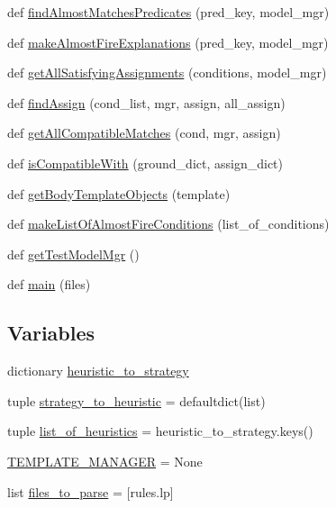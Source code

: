 \begin{DoxyCompactItemize}
\item 
def \hyperlink{namespaceexplanation__extractor_a97bc4aa83dd1f33e2055e0cd04280983}{find\+Almost\+Matches\+Predicates} (pred\+\_\+key, model\+\_\+mgr)
\item 
def \hyperlink{namespaceexplanation__extractor_ad9ad528058d7d4a987217e34962fafa1}{make\+Almost\+Fire\+Explanations} (pred\+\_\+key, model\+\_\+mgr)
\item 
def \hyperlink{namespaceexplanation__extractor_a245c76a80c6861aa9913a4c0ae657532}{get\+All\+Satisfying\+Assignments} (conditions, model\+\_\+mgr)
\item 
def \hyperlink{namespaceexplanation__extractor_aa2ee543a844a51fd175237425613e637}{find\+Assign} (cond\+\_\+list, mgr, assign, all\+\_\+assign)
\item 
def \hyperlink{namespaceexplanation__extractor_a6f48fd0483449ab57c4fc59bf46d9030}{get\+All\+Compatible\+Matches} (cond, mgr, assign)
\item 
def \hyperlink{namespaceexplanation__extractor_ac4ebd7452ba8d0cd181de6ff9e826a97}{is\+Compatible\+With} (ground\+\_\+dict, assign\+\_\+dict)
\item 
def \hyperlink{namespaceexplanation__extractor_a9ff3544e6f17deeb9ca26720176c3425}{get\+Body\+Template\+Objects} (template)
\item 
def \hyperlink{namespaceexplanation__extractor_aceb0f7d5fe4722c93251a451c0887cf9}{make\+List\+Of\+Almost\+Fire\+Conditions} (list\+\_\+of\+\_\+conditions)
\item 
def \hyperlink{namespaceexplanation__extractor_a83d1ad83ea4f6f229f663c8f2a6fec4e}{get\+Test\+Model\+Mgr} ()
\item 
def \hyperlink{namespaceexplanation__extractor_ab07ea7707a24b1b7c5a0abfeab45c62d}{main} (files)
\end{DoxyCompactItemize}
\subsection*{Variables}
\begin{DoxyCompactItemize}
\item 
dictionary \hyperlink{namespaceexplanation__extractor_a4e9dc7c262525efa41529de247ccb96a}{heuristic\+\_\+to\+\_\+strategy}
\item 
tuple \hyperlink{namespaceexplanation__extractor_ac32b3e381284882ab71367fde9f5c646}{strategy\+\_\+to\+\_\+heuristic} = defaultdict(list)
\item 
tuple \hyperlink{namespaceexplanation__extractor_a4f4d79f4f4c8925bd6353200232eb735}{list\+\_\+of\+\_\+heuristics} = heuristic\+\_\+to\+\_\+strategy.\+keys()
\item 
\hyperlink{namespaceexplanation__extractor_add16cd790071f284854455eddfa329a1}{T\+E\+M\+P\+L\+A\+T\+E\+\_\+\+M\+A\+N\+A\+G\+E\+R} = None
\item 
list \hyperlink{namespaceexplanation__extractor_a4df375151186067de08268d91ffe50f9}{files\+\_\+to\+\_\+parse} = \mbox{[}\textquotesingle{}rules.\+lp\textquotesingle{}\mbox{]}
\end{DoxyCompactItemize}



